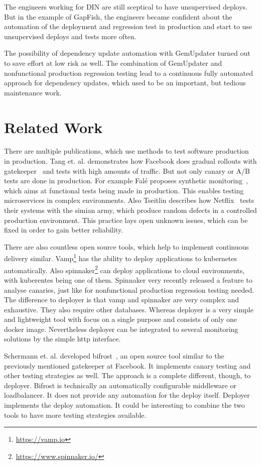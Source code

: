 The engineers working for DIN are still sceptical to have unsupervised deploys. But in the
example of GapFish, the engineers became confident about the automation of the deployment
and regression test in production and start to use unsupervised deploys and tests more often.

The possibility of dependency update automation with GemUpdater turned out to save effort
at low risk as well. The combination of GemUpdater and nonfunctional production regression
testing lead to a continuous fully automated approach for dependency updates, which used
to be an important, but tedious maintenance work.

\section{Related Work}

There are multiple publications, which use methods to test software production in
production. Tang et. al. demonstrates how Facebook does gradual rollouts with
gatekeeper~\cite{fb_config_management} and tests with high amounts of traffic. But not
only canary or A/B tests are done in production. For example Falé proposes synthetic
monitoring~\cite{synthmonitoring}, which aims at functional tests being made in
production. This enables testing microservices in complex environments. Also Tseitlin
describes how Netflix~\cite{antifragile_org} tests their systems with the simian army,
which produce random defects in a controlled production environment. This practice lays
open unknown issues, which can be fixed in order to gain better reliability.

There are also countless open source tools, which help to implement continuous delivery
similar. Vamp\footnote{\url{https://vamp.io}} has the ability to deploy applications to
kubernetes automatically. Also spinnaker\footnote{\url{https://www.spinnaker.io/}} can
deploy applications to cloud environments, with kuberentes being one of them. Spinnaker
very recently released a feature to analyse canaries, just like for nonfunctional
production regression testing needed. The difference to deployer is that vamp and
spinnaker are very complex and exhaustive. They also require other databases. Whereas
deployer is a very simple and lightweight tool with focus on a single purpose and consists
of only one docker image. Nevertheless deployer can be integrated to several monitoring
solutions by the simple http interface.

Schermann et. al. developed bifrost~\cite{bifrost}, an open source tool similar to the
previously mentioned gatekeeper at Facebook. It implements canary testing and other
testing strategies as well. The approach is a complete different, though, to
deployer. Bifrost is technically an automatically configurable middleware or
loadbalancer. It does not provide any automation for the deploy itself. Deployer
implements the deploy automation. It could be interesting to combine the two tools to have
more testing strategies available.

